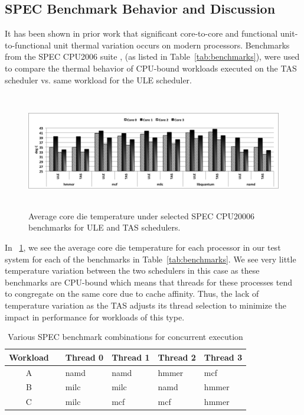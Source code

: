 \documentclass[times, 10pt,twocolumn]{IEEEtran}
\begin{document}
\subsection{SPEC Benchmark Behavior and Discussion}
\label{sec:microarch} 
It has been shown in prior work \cite{Choi2007,Cher2011} that
significant core-to-core and functional unit-to-functional unit thermal
variation occurs on modern processors. Benchmarks from the SPEC CPU2006
suite \cite{Spec2006}, (as listed in Table~\eqref{tab:benchmarks}),
were used to compare the thermal behavior of CPU-bound workloads
executed on the TAS scheduler vs. same workload for the ULE scheduler.

\newline
\begin{figure}[!tbhp] 
\centering
  \includegraphics[width=1.0\linewidth,height=2in]{graphics/speccputemp}
  \caption{Average core die temperature under selected SPEC CPU20006
benchmarks for ULE and TAS schedulers.}
  \label{fig:ubenchmarks}
\end{figure} 
In \figurename~\ref{fig:ubenchmarks}, we see the average
core die temperature for each processor in our test system for each of
the benchmarks in Table~\ref{tab:benchmarks}.  We see very little
temperature variation between the two schedulers in this case as these
benchmarks are CPU-bound which means that threads for these processes
tend to congregate on the same core due to cache affinity.  Thus, the
lack of temperature variation as the TAS adjusts its thread selection to
minimize the impact in performance for workloads of this type.

\newline
\begin{table}[bp]
  \caption{Various SPEC benchmark combinations for concurrent execution}
  \label{tab:crossbench} \centering
  \begin{tabular}{clllll} \hline Workload & & Thread 0 & Thread 1 &
Thread 2 & Thread 3 \\ \hline \hline A & & namd & namd & hmmer & mcf \\
B & & milc & milc & namd & hmmer \\ C & & milc & mcf & mcf & hmmer \\
\hline
  \end{tabular}
\end{table}
\end{document}
